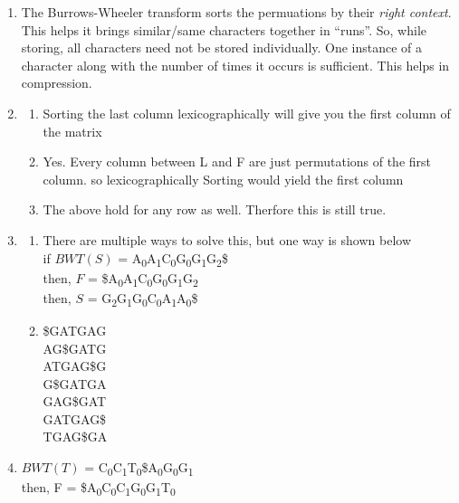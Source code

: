 \documentclass[12pt]{article}
\begin{document}
\begin{enumerate}
\begin{enumerate}
    \end{enumerate}
\item The Burrows-Wheeler transform sorts the permuations by their \textit{right context}. This helps it brings similar/same characters together in 
“runs”. So, while storing, all characters need not be stored individually. One instance of a character along with the
number of times it occurs is sufficient. This helps in compression.
\item
    \begin{enumerate}
        \item Sorting the last column lexicographically will give you the first column of the matrix
        \item Yes. Every column between L and F are just permutations of the first column. so lexicographically Sorting
        would yield the first column
        \item The above hold for any row as well. Therfore this is still true.
    \end{enumerate}
    \pagebreak
\item 
    \begin{enumerate}
        \item There are multiple ways to solve this, but one way is shown below \\ 
             if $BWT(S)$ = A\textsubscript{0}A\textsubscript{1}C\textsubscript{0}G\textsubscript{0}G\textsubscript{1}G\textsubscript{2}\$
             \\ then, $F$ = \$A\textsubscript{0}A\textsubscript{1}C\textsubscript{0}G\textsubscript{0}G\textsubscript{1}G\textsubscript{2}
            \\ then, $S$ = G\textsubscript{2}G\textsubscript{1}G\textsubscript{0}C\textsubscript{0}A\textsubscript{1}A\textsubscript{0}\$
        \item \$GATGAG \\
        AG\$GATG \\
        ATGAG\$G \\
        G\$GATGA \\
        GAG\$GAT \\
        GATGAG\$ \\
        TGAG\$GA \\
    \end{enumerate}
\item $BWT(T)$ = C\textsubscript{0}C\textsubscript{1}T\textsubscript{0}\$A\textsubscript{0}G\textsubscript{0}G\textsubscript{1}\\
then, F = \$A\textsubscript{0}C\textsubscript{0}C\textsubscript{1}G\textsubscript{0}G\textsubscript{1}T\textsubscript{0}\\

\end{enumerate}
\end{document}
